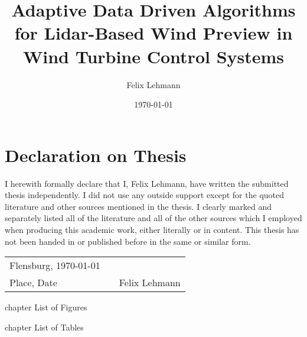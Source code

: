 \documentclass[a4paper, 12pt, bibtotoc, toc=chapterentrywithdots, hyphens, numbers=noenddot]{scrreprt}
\title{Adaptive Data Driven Algorithms for Lidar-Based Wind Preview in Wind Turbine Control Systems}
\author{Felix Lehmann}
\date{\today}
\numberwithin{equation}{chapter} %
\begin{document}
\pagestyle{empty}



\chapter*{Declaration on Thesis}
\thispagestyle{Preamble}

I herewith formally declare that I, Felix Lehmann, have written the submitted thesis independently. I did not use any outside support except for the quoted literature and other sources mentioned in the thesis. I clearly marked and separately listed all of the literature and all of the other sources which I employed when producing this academic work, either literally or in content. This thesis has not been handed in or published before in the same or similar form.

\vspace{4cm}

\begin{tabular}[h]{l p{2cm} p{7cm}}
Flensburg, \today &  & \\
\cline{1-1}\cline{3-3}
{\small Place, Date}& & {\small Felix Lehmann}\\
\end{tabular}


\newpage
{}
\tableofcontents
\thispagestyle{Preamble}

\newpage
\listoffigures
\thispagestyle{Preamble}
 {chapter} {List of Figures}

\newpage
\listoftables
\thispagestyle{Preamble}
 {chapter} {List of Tables}

\newpage
\thispagestyle{Preamble}
\printglossary[type=\acronymtype,title={List of Abbreviations}, style=long]
\end{document}
